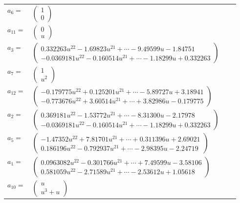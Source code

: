 \documentclass[1p]{elsarticle_modified}
\theoremstyle{definition}
\begin{document}
\begin{tabular}{m{7pt} m{180pt} m{7pt} m{180pt} }
\flushright $a_{6}=$&$\begin{pmatrix}1\\0\end{pmatrix}$ \\
\flushright $a_{11}=$&$\begin{pmatrix}0\\u\end{pmatrix}$ \\
\flushright $a_{3}=$&$\begin{pmatrix}0.332263 u^{22}-1.69823 u^{21}+\cdots-9.49599 u-1.84751\\-0.0369181 u^{22}-0.160514 u^{21}+\cdots-1.18299 u+0.332263\end{pmatrix}$ \\
\flushright $a_{7}=$&$\begin{pmatrix}1\\u^2\end{pmatrix}$ \\
\flushright $a_{12}=$&$\begin{pmatrix}-0.179775 u^{22}+0.125201 u^{21}+\cdots-5.89727 u+3.18941\\-0.773676 u^{22}+3.60514 u^{21}+\cdots+3.82986 u-0.179775\end{pmatrix}$ \\
\flushright $a_{2}=$&$\begin{pmatrix}0.369181 u^{22}-1.53772 u^{21}+\cdots-8.31300 u-2.17978\\-0.0369181 u^{22}-0.160514 u^{21}+\cdots-1.18299 u+0.332263\end{pmatrix}$ \\
\flushright $a_{5}=$&$\begin{pmatrix}-1.47352 u^{22}+7.81701 u^{21}+\cdots+0.311396 u+2.69021\\0.186196 u^{22}-0.792937 u^{21}+\cdots-2.98395 u-2.24719\end{pmatrix}$ \\
\flushright $a_{1}=$&$\begin{pmatrix}0.0963082 u^{22}-0.301766 u^{21}+\cdots+7.49599 u-3.58106\\0.581059 u^{22}-2.71589 u^{21}+\cdots-2.53612 u+1.05618\end{pmatrix}$ \\
\flushright $a_{10}=$&$\begin{pmatrix}u\\u^3+u\end{pmatrix}$ \\

\end{tabular}
\end{document}
